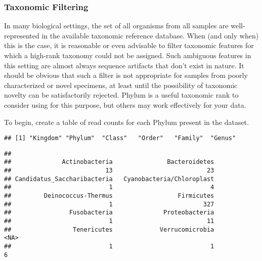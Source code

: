 \subsubsection*{Taxonomic Filtering}

In many biological settings, the set of all organisms from all samples are well-represented in the available taxonomic reference database.
When (and only when) this is the case, it is reasonable or even advisable to filter taxonomic features
for which a high-rank taxonomy could not be assigned.
Such ambiguous features in this setting are almost always sequence artifacts that don't exist in nature.
It should be obvious that such a filter is not appropriate for samples from poorly characterized or novel specimens, at least until the possibility of taxonomic novelty can be satisfactorily rejected.
Phylum is a useful taxonomic rank to consider using for this purpose, but others may work effectively for your data.

To begin, create a table of read counts for each Phylum present in the dataset.

\begin{knitrout}
\color{fgcolor}\begin{kframe}
\begin{alltt}
\end{alltt}
\begin{verbatim}
## [1] "Kingdom" "Phylum"  "Class"   "Order"   "Family"  "Genus"
\end{verbatim}
\begin{alltt}
\hlstd{(}\hlstd{(ps)[,} \hlstd{],}  \hlstd{=} \hlstd{)}
\end{alltt}
\begin{verbatim}
## 
##              Actinobacteria               Bacteroidetes 
##                          13                          23 
## Candidatus_Saccharibacteria   Cyanobacteria/Chloroplast 
##                           1                           4 
##         Deinococcus-Thermus                  Firmicutes 
##                           1                         327 
##                Fusobacteria              Proteobacteria 
##                           1                          11 
##                 Tenericutes             Verrucomicrobia                         <NA> 
##                           1                           1                          6
\end{verbatim}
\end{kframe}
\end{knitrout}

